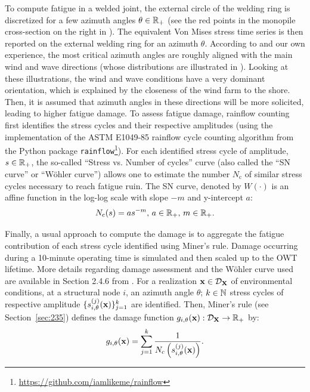 To compute fatigue in a welded joint, the external circle of the welding ring is discretized for a few azimuth angles $\theta \in \mathbb{R}_+$ (see the red points in the monopile cross-section on the right in ). 
The equivalent Von Mises stress time series is then reported on the external welding ring for an azimuth $\theta$. 
According to \cite{li_zhan_2020} and our own experience, the most critical azimuth angles are roughly aligned with the main wind and wave directions (whose distributions are illustrated in ). 
Looking at these illustrations, the wind and wave conditions have a very dominant orientation, which is explained by the closeness of the wind farm to the shore. 
Then, it is assumed that azimuth angles in these directions will be more solicited, leading to higher fatigue damage. 
To assess fatigue damage, rainflow counting \citep{dowling_1972} first identifies the stress cycles and their respective amplitudes (using the implementation of the ASTM E1049-85 rainflow cycle counting algorithm from the Python package \texttt{rainflow}\footnote{\href{https://github.com/iamlikeme/rainflow}{https://github.com/iamlikeme/rainflow}}). 
For each identified stress cycle of amplitude, $s \in \mathbb{R}_+$, the so-called ``Stress vs. Number of cycles'' curve (also called the ``SN curve'' or ``W\"ohler curve'') allows one to estimate the number $N_{\mathrm{c}}$ of similar stress cycles necessary to reach fatigue ruin. 
The SN curve, denoted by $W(\cdot)$ is an affine function in the log-log scale with slope $-m$ and y-intercept $a$:
\begin{equation}
    N_{\mathrm{c}}(s) = a s^{-m}, \, a\in\mathbb{R}_+, \, m\in\mathbb{R}_+.
    \label{eq:wohler}
\end{equation}

Finally, a usual approach to compute the damage is to aggregate the fatigue contribution of each stress cycle identified using Miner’s rule. 
Damage occurring during a 10-minute operating time is simulated and then scaled up to the OWT lifetime. 
More details regarding damage assessment and the W\"ohler curve used are available in Section 2.4.6 from \citep{dnv_fatigue_2016}. 
For a realization ${\bf x} \in \mathcal{D}_{{\bf X}}$ of environmental conditions, at a structural node $i$, an azimuth angle $\theta$; $k \in \mathbb{N}$ stress cycles of respective amplitude $\{s_{i, \theta}^{(j)}({\bf x})\}_{j=1}^k$ are identified. 
Then, Miner's rule (see Section~\ref{sec:235}) defines the damage function $g_{i, \theta}({\bf x}): \mathcal{D}_{{\bf X}} \rightarrow \mathbb{R}_+$ by:
\begin{equation}
    g_{i, \theta}({\bf x}) = \sum_{j=1}^{k} \frac{1}{N_{\mathrm{c}}\left(s_{i, \theta}^{(j)}({\bf x})\right)}.
    \label{eq:miner1}
\end{equation}

